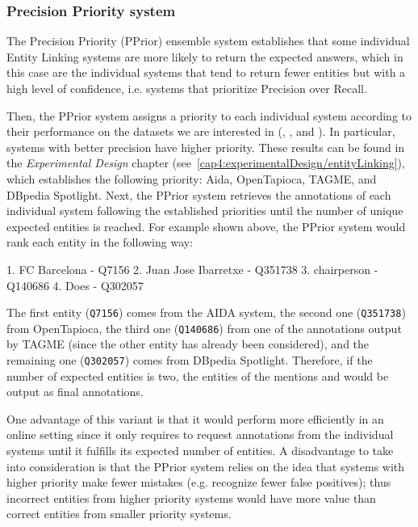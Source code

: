 \subsubsection{Precision Priority system}
\label{cap3:system/entLinModule/ensembleSystems/pprior}
The Precision Priority (PPrior) ensemble system establishes that some individual Entity 
Linking systems are more likely to return the expected answers, which in this case are the 
individual systems that tend to return fewer entities but with a high level of confidence, 
i.e. systems that prioritize Precision over Recall.

Then, the PPrior system assigns a priority to each individual system according to their 
performance on the datasets we are interested in (\LCQuADtwo, \DBNQA, and \QALDseven). In 
particular, systems with better precision have higher priority. These results can be found in 
the \textit{Experimental Design} chapter (see~\ref{cap4:experimentalDesign/entityLinking}), 
which establishes the following priority: Aida, OpenTapioca, TAGME, and DBpedia Spotlight. Next, 
the PPrior system retrieves the annotations of each individual system following the established 
priorities until the number of unique expected entities is reached. 
For example shown above, the PPrior system would rank each entity in the following way:

\begin{sparqlcode}[]
1. FC Barcelona - Q7156
2. Juan Jose Ibarretxe - Q351738
3. chairperson - Q140686
4. Does - Q302057     
\end{sparqlcode}

The first entity (\texttt{Q7156}) comes from the AIDA system, the second one (\texttt{Q351738}) 
from OpenTapioca, the third one (\texttt{Q140686}) from one of the annotations output by 
TAGME (since the other entity has already been considered), and the remaining one (\texttt{Q302057}) 
comes from DBpedia Spotlight. Therefore, if the number of expected entities is two, the 
entities of the mentions  and  would be 
output as final annotations.

One advantage of this variant is that it would perform more efficiently in an online setting 
since it only requires to request annotations from the individual systems until it fulfills 
its expected number of entities. A disadvantage to take into consideration is that the PPrior 
system relies on the idea that systems with higher priority make fewer mistakes (e.g. 
recognize fewer false positives); thus incorrect entities from higher priority systems would 
have more value than correct entities from smaller priority systems.

